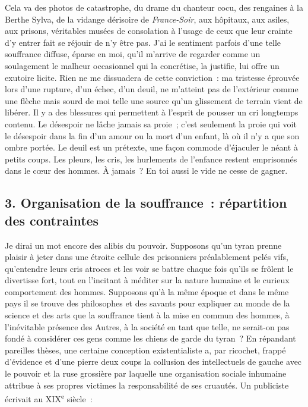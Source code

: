 \documentclass[french,twoside]{book} %
\begin{document}
Cela va des photos de catastrophe, du drame du chanteur cocu, des rengaines à la Berthe Sylva, de la vidange dérisoire de \emph{France-Soir}, aux hôpitaux, aux asiles, aux prisons, véritables musées de consolation à l’usage de ceux que leur crainte d’y entrer fait se réjouir de n’y être pas. J’ai le sentiment parfois d’une telle souffrance diffuse, éparse en moi, qu’il m’arrive de regarder comme un soulagement le malheur occasionnel qui la concrétise, la justifie, lui offre un exutoire licite. Rien ne me dissuadera de cette conviction : ma tristesse éprouvée lors d’une rupture, d’un échec, d’un deuil, ne m’atteint pas de l’extérieur comme une flèche mais sourd de moi telle une source qu’un glissement de terrain vient de libérer. Il y a des blessures qui permettent à l’esprit de pousser un cri longtemps contenu. Le désespoir ne lâche jamais sa proie ; c’est seulement la proie qui voit le désespoir dans la fin d’un amour ou la mort d’un enfant, là où il n’y a que son ombre portée. Le deuil est un prétexte, une façon commode d’éjaculer le néant à petits coups. Les pleurs, les cris, les hurlements de l’enfance restent emprisonnés dans le cœur des hommes. À jamais ? En toi aussi le vide ne cesse de gagner.
\subsection[{3. Organisation de la souffrance : répartition des contraintes}]{\textsc{3.} Organisation de la souffrance : répartition des contraintes}
\noindent Je dirai un mot encore des alibis du pouvoir. Supposons qu’un tyran prenne plaisir à jeter dans une étroite cellule des prisonniers préalablement pelés vifs, qu’entendre leurs cris atroces et les voir se battre chaque fois qu’ils se frôlent le divertisse fort, tout en l’incitant à méditer sur la nature humaine et le curieux comportement des hommes. Supposons qu’à la même époque et dans le même pays il se trouve des philosophes et des savants pour expliquer au monde de la science et des arts que la souffrance tient à la mise en commun des hommes, à l’inévitable présence des Autres, à la société en tant que telle, ne serait-on pas fondé à considérer ces gens comme les chiens de garde du tyran ? En répandant pareilles thèses, une certaine conception existentialiste a, par ricochet, frappé d’évidence et d’une pierre deux coups la collusion des intellectuels de gauche avec le pouvoir et la ruse grossière par laquelle une organisation sociale inhumaine attribue à ses propres victimes la responsabilité de ses cruautés. Un publiciste écrivait au XIX\textsuperscript{e} siècle :\par
\end{document}
